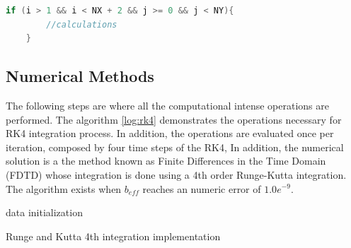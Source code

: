 \begin{lstlisting}[language=C++, label={lst:if}, caption={Laplacian X using global memory}]
    if (i > 1 && i < NX + 2 && j >= 0 && j < NY){
    	//calculations
    }
\end{lstlisting}

\subsection{Numerical Methods}

The following steps are where all the computational intense operations are performed. The algorithm \ref{log:rk4} demonstrates the operations necessary for RK4 integration process. In addition, the operations are evaluated once per iteration, composed by four time steps of the RK4, In addition, the numerical solution is a the method known as Finite Differences in the Time Domain (FDTD) whose integration is done using a 4th order Runge-Kutta integration. The algorithm exists when $b_{eff}$ reaches an numeric error of $1.0e^{-9}$.

\begin{algorithm}[H]
 data initialization\;
 \label{log:rk4}
 \caption{Runge and Kutta 4th integration implementation}
\end{algorithm}

